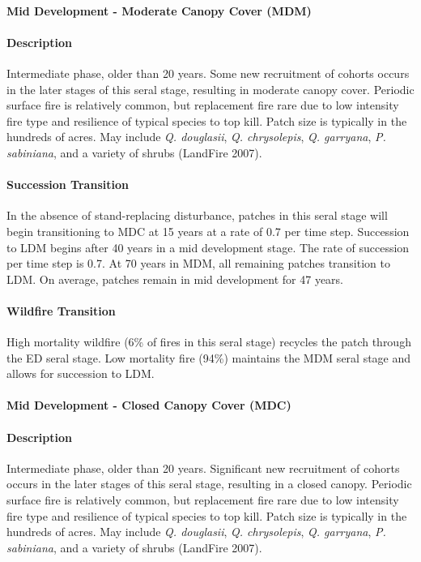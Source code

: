 \noindent\hrulefill

\paragraph{Mid Development - Moderate Canopy Cover (MDM)}

\paragraph{Description} Intermediate phase, older than 20 years. Some new recruitment of cohorts occurs in the later stages of this seral stage, resulting in moderate canopy cover. Periodic surface fire is relatively common, but replacement fire rare due to low intensity fire type and resilience of typical species to top kill. Patch size is typically in the hundreds of acres. May include \emph{Q. douglasii}, \emph{Q. chrysolepis}, \emph{Q. garryana}, \emph{P. sabiniana}, and a variety of shrubs (LandFire 2007).

\paragraph{Succession Transition} In the absence of stand-replacing disturbance, patches in this seral stage will begin transitioning to MDC at 15 years at a rate of 0.7 per time step. Succession to LDM begins after 40 years in a mid development stage. The rate of succession per time step is 0.7. At 70 years in MDM, all remaining patches transition to LDM. On average, patches remain in mid development for 47 years.

\paragraph{Wildfire Transition} High mortality wildfire (6\% of fires in this seral stage) recycles the patch through the ED seral stage. Low mortality fire (94\%) maintains the MDM seral stage and allows for succession to LDM.

\noindent\hrulefill

\paragraph{Mid Development - Closed Canopy Cover (MDC)}

\paragraph{Description} Intermediate phase, older than 20 years. Significant new recruitment of cohorts occurs in the later stages of this seral stage, resulting in a closed canopy. Periodic surface fire is relatively common, but replacement fire rare due to low intensity fire type and resilience of typical species to top kill. Patch size is typically in the hundreds of acres. May include \emph{Q. douglasii}, \emph{Q. chrysolepis}, \emph{Q. garryana}, \emph{P. sabiniana}, and a variety of shrubs (LandFire 2007).

